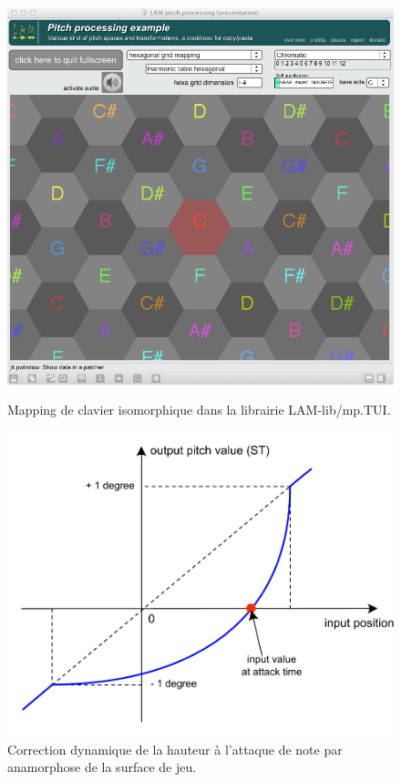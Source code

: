 \begin{figure}[!htbp]
	\captionsetup{format=plain}%
	\centering
	\begin{minipage}[t]{0.48\textwidth}
	 	\includegraphics[width=\linewidth]{gfx/04_algorithms/MID-HarmonicHexa-mapping.png}
		\caption[Clavier isomorphique dans Max]{Mapping de clavier isomorphique dans la librairie LAM-lib/mp.TUI.}
		\label{fig:algorithms:MID-hexakeyboard}
	\end{minipage}
	\hspace{.02\linewidth}
	\begin{minipage}[t]{0.48\textwidth}
	  \includegraphics[width=\linewidth]{gfx/04_algorithms/MID-dynamic-pitch-correction.pdf}
		\caption[Correction dynamique de la hauteur]{Correction dynamique de la hauteur à l'attaque de note par anamorphose de la surface de jeu.}
		\label{fig:algorithms:MID-dynamic-pitch-correction}
	\end{minipage}
\end{figure}

